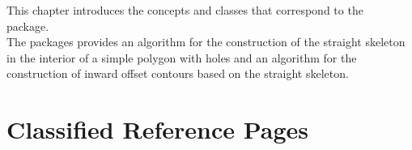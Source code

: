 


This chapter introduces the concepts and classes that correspond to the \cgal\  package. \\
The packages provides an algorithm for the construction of the
straight skeleton in the interior of a simple polygon with holes and
an algorithm for the construction of inward offset contours based on
the straight skeleton.


\section{Classified Reference Pages}

 \\
 \\
 \\
 \\
 \\
 \\
 \\
 \\
 \\

